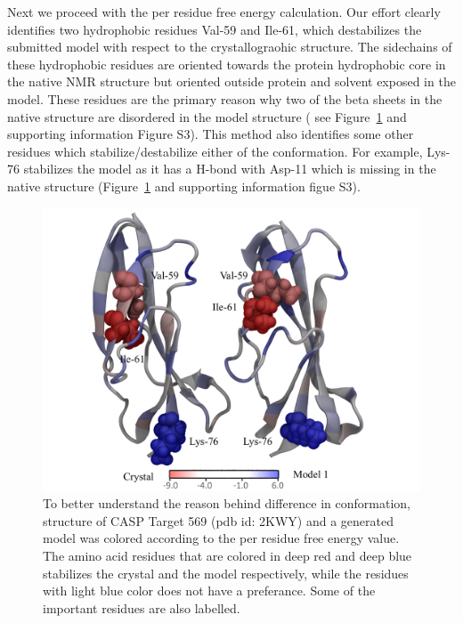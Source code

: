 \documentclass[12pt]{article}
\begin{document}
Next we proceed with the per residue free energy calculation. Our effort clearly identifies two hydrophobic residues 
Val-59 and Ile-61, which destabilizes the submitted model with respect to the crystallograohic structure.
The sidechains of these hydrophobic residues are oriented towards the protein hydrophobic core in the
native NMR structure but oriented outside protein and solvent exposed in the model. These residues are the primary reason
why two of the beta sheets in the native structure are disordered in the model structure ( see Figure~\ref{fig:T0569_per_residue}
and supporting information Figure S3). This method also identifies some other residues which stabilize/destabilize either 
of the conformation. For
example, Lys-76 stabilizes the model as it has a H-bond with Asp-11 which is missing in the native structure
(Figure~\ref{fig:T0569_per_residue} and supporting information figue S3).

\begin{figure}
\begin{center}
\includegraphics[width=4.3 in,height=4 in]{T0569_perres1.pdf}
\end{center}
\caption{To better understand the reason behind difference in conformation, structure of CASP Target 569 (pdb id: 2KWY) and a 
generated model was colored according to the per residue free energy value. The amino acid residues that are colored in deep red 
and deep blue stabilizes the crystal and the model respectively, while the residues with light blue color does not have a preferance.
 Some of the important residues are also labelled.}   
\label{fig:T0569_per_residue}
\end{figure}
\end{document}
